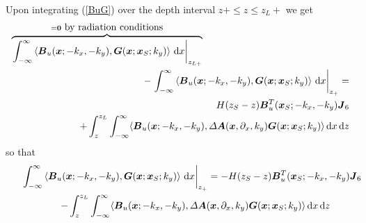 Upon integrating  (\ref{BuG}) over the depth interval 
$z+ \le z \le {z}_{L}+$ we get 
\begin{eqnarray*}  
\lefteqn{\overbrace{\left.\int_{-\infty}^{\infty} \left\langle{  {\bmi B}_{u}({\bmi x};-k_x,-k_y),  
{\bmi G}({\bmi  x} ; {\bmi  x}_{ S};k_y)
}\right\rangle \,{\rm d}x \right|_{{z}_{L+}}}^{={\bf 0} \ \mbox{by 
radiation conditions}}}\\
&&\qquad\qquad\qquad
-\left.\int_{-\infty}^{\infty} \left\langle{  {\bmi B}_{u}({\bmi x};-k_x,-k_y),  
{\bmi G}({\bmi  x} ; {\bmi  x}_{ S};k_y)
}\right\rangle \,{\rm d}x \right|_{{z}_{+}}=\\
&&
H({z}_{S}-z) {\bmi B}{}_{u}^{T}({\bmi x}_{S};-k_x,-k_y)
{\bmi  J}_{6}  \\
&&\qquad\qquad\qquad
+\int_{z}^{z_L}
\int_{-\infty}^{\infty} \langle{\bmi B}_{u}({\bmi x};-k_x,-k_y), {\mit \Delta}
{\bmi A}({\bmi x},{\partial}_{x}, k_y) {\bmi G}({\bmi  x} ; {\bmi  x}_{ S};k_y) \rangle 
\,{\rm d}x\,{\rm d}z
\end{eqnarray*} 
so that
\begin{eqnarray}  \label{(2.4.3)}
\lefteqn{\!\!\!\!\!\!
\left.\int_{-\infty}^{\infty} \left\langle{  {\bmi B}_{u}({\bmi x};-k_x,-k_y),  
{\bmi G}({\bmi  x} ; {\bmi  x}_{ S};k_y)
}\right\rangle \,{\rm d}x \right|_{{z}_{+}}=-H({z}_{S}-z) {\bmi B}{}_{u}^{T}({\bmi x}_{S};-k_x,-k_y)
{\bmi  J}_{6}}\nonumber\\
&&\qquad
-\int_{z}^{z_L}
\int_{-\infty}^{\infty} \langle{\bmi B}_{u}({\bmi x};-k_x,-k_y), {\mit \Delta}
{\bmi A}({\bmi x},{\partial}_{x}, k_y) {\bmi G}({\bmi  x} ; {\bmi  x}_{ S};k_y) \rangle 
\,{\rm d}x\,{\rm d}z
\end{eqnarray} 


